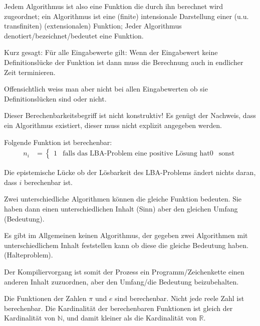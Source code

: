 \documentclass{scrartcl}
\begin{document}
\begin{theorem}
\begin{theorem}
\begin{poof}
\begin{theorem}
\begin{remark}
Jedem Algorithmus ist also eine Funktion die durch ihn berechnet wird zugeordnet;
ein Algorithmus ist eine (finite) intensionale Darstellung einer 
(u.u. transfiniten) (extensionalen) Funktion;
Jeder Algorithmus denotiert/bezeichnet/bedeutet eine Funktion.
\end{remark}

\begin{remark}
Kurz gesagt: 
Für alle Eingabewerte gilt: 
Wenn der Eingabewert keine Definitionslücke der Funktion ist
dann muss die Berechnung auch in endlicher Zeit terminieren.

Offensichtlich weiss man aber nicht bei allen Eingabewerten ob sie 
Definitionslücken sind oder nicht.
\end{remark}

\begin{remark}
Dieser Berechenbarkeitsbegriff ist nicht konstruktiv!
Es genügt der Nachweis, dass ein Algorithmus existiert, dieser muss
nicht explizit angegeben werden.

\begin{example}
Folgende Funktion ist berechenbar:
\begin{align*}
	n_{i} &= 
		\begin{cases}
    	    1 & \text{falls das LBA-Problem eine positive Lösung hat}
    	    0     & \text{sonst}
    	\end{cases}
\end{align*}
\end{example}
Die epistemische Lücke ob der Lösbarkeit des LBA-Problems ändert nichts 
daran, dass $i$ berechenbar ist.
\end{remark}

\begin{remark}
Zwei unterschiedliche Algorithmen können die gleiche Funktion bedeuten.
Sie haben dann einen unterschiedlichen Inhalt (Sinn) aber den gleichen
Umfang (Bedeutung).

Es gibt im Allgemeinen keinen Algorithmus, der gegeben zwei Algorithmen mit 
unterschiedlichem Inhalt feststellen kann ob diese die gleiche Bedeutung haben.
(Halteproblem).
\end{remark}

\begin{remark}
Der Kompiliervorgang ist somit der Prozess ein Programm/Zeichenkette
einen anderen Inhalt zuzuordnen, aber den Umfang/die Bedeutung beizubehalten.
\end{remark}


\begin{remark}
Die Funktionen der Zahlen $π$ und $e$ sind berechenbar.%
Nicht jede reele Zahl ist berechenbar.
Die Kardinalität der berechenbaren Funktionen ist gleich der Kardinalität von $ℕ$,
und damit kleiner als die Kardinalität von $ℝ$.


\end{remark}
\end{theorem}
\end{poof}
\end{theorem}
\end{theorem}
\end{document}
